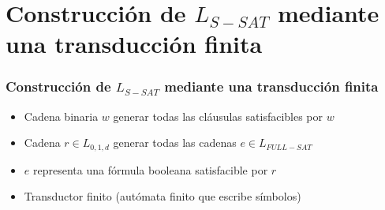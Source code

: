 \documentclass{beamer}
\begin{document}
\section{Construcción de $L_{S-SAT}$ mediante una transducción finita}
\begin{frame}
    \frametitle{Construcción de $L_{S-SAT}$ mediante una transducción finita}
    
    \begin{itemize}
        \item Cadena binaria $w$ generar todas las cláusulas satisfacibles por $w$
              \pause
        \item Cadena $r\in L_{0,1,d}$ generar todas las cadenas $e\in L_{FULL-SAT}$
              \pause
        \item $e$ representa una fórmula booleana satisfacible por $r$
              \pause
        \item Transductor finito (autómata finito que escribe símbolos)
    \end{itemize}
\end{frame}
\end{document}
